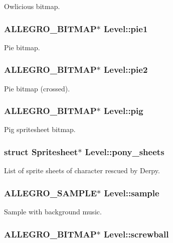 Owlicious bitmap. \hypertarget{structLevel_acf777bae2b7533d8eda0d9766ea402df}{
\subsubsection[{pie1}]{\setlength{\rightskip}{0pt plus 5cm}A\-L\-L\-E\-G\-R\-O\-\_\-\-B\-I\-T\-M\-A\-P$\ast$ Level\-::pie1}}\label{structLevel_acf777bae2b7533d8eda0d9766ea402df}
Pie bitmap. \hypertarget{structLevel_a6b817f8a028cbb01ea9d7e1e6dbcdede}{
\subsubsection[{pie2}]{\setlength{\rightskip}{0pt plus 5cm}A\-L\-L\-E\-G\-R\-O\-\_\-\-B\-I\-T\-M\-A\-P$\ast$ Level\-::pie2}}\label{structLevel_a6b817f8a028cbb01ea9d7e1e6dbcdede}
Pie bitmap (crossed). \hypertarget{structLevel_aacde4816ff59c4d9ab6f403758630b8f}{
\subsubsection[{pig}]{\setlength{\rightskip}{0pt plus 5cm}A\-L\-L\-E\-G\-R\-O\-\_\-\-B\-I\-T\-M\-A\-P$\ast$ Level\-::pig}}\label{structLevel_aacde4816ff59c4d9ab6f403758630b8f}
Pig spritesheet bitmap. \hypertarget{structLevel_a591b830752cc796a306e96166f736e3b}{
\subsubsection[{pony\-\_\-sheets}]{\setlength{\rightskip}{0pt plus 5cm}struct {\bf Spritesheet}$\ast$ Level\-::pony\-\_\-sheets}}\label{structLevel_a591b830752cc796a306e96166f736e3b}
List of sprite sheets of character rescued by Derpy. \hypertarget{structLevel_a234fa7b9ec35dd360e4e3c48a944fc7d}{
\subsubsection[{sample}]{\setlength{\rightskip}{0pt plus 5cm}A\-L\-L\-E\-G\-R\-O\-\_\-\-S\-A\-M\-P\-L\-E$\ast$ Level\-::sample}}\label{structLevel_a234fa7b9ec35dd360e4e3c48a944fc7d}
Sample with background music. \hypertarget{structLevel_a40c90c0712efb86cd76d0dcae74f2cbd}{
\subsubsection[{screwball}]{\setlength{\rightskip}{0pt plus 5cm}A\-L\-L\-E\-G\-R\-O\-\_\-\-B\-I\-T\-M\-A\-P$\ast$ Level\-::screwball}}\label{structLevel_a40c90c0712efb86cd76d0dcae74f2cbd}
